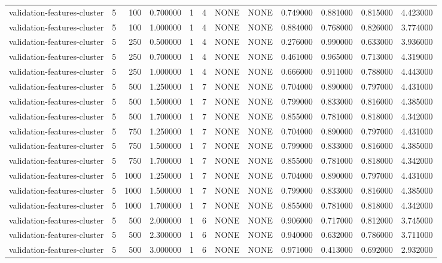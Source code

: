 \begin{tabular}{lrrrllllrrrr}
validation-features-cluster & 5 & 100 & 0.700000 & 1 & 4 & NONE & NONE & 0.749000 & 0.881000 & 0.815000 & 4.423000 \\
validation-features-cluster & 5 & 100 & 1.000000 & 1 & 4 & NONE & NONE & 0.884000 & 0.768000 & 0.826000 & 3.774000 \\
validation-features-cluster & 5 & 250 & 0.500000 & 1 & 4 & NONE & NONE & 0.276000 & 0.990000 & 0.633000 & 3.936000 \\
validation-features-cluster & 5 & 250 & 0.700000 & 1 & 4 & NONE & NONE & 0.461000 & 0.965000 & 0.713000 & 4.319000 \\
validation-features-cluster & 5 & 250 & 1.000000 & 1 & 4 & NONE & NONE & 0.666000 & 0.911000 & 0.788000 & 4.443000 \\
validation-features-cluster & 5 & 500 & 1.250000 & 1 & 7 & NONE & NONE & 0.704000 & 0.890000 & 0.797000 & 4.431000 \\
validation-features-cluster & 5 & 500 & 1.500000 & 1 & 7 & NONE & NONE & 0.799000 & 0.833000 & 0.816000 & 4.385000 \\
validation-features-cluster & 5 & 500 & 1.700000 & 1 & 7 & NONE & NONE & 0.855000 & 0.781000 & 0.818000 & 4.342000 \\
validation-features-cluster & 5 & 750 & 1.250000 & 1 & 7 & NONE & NONE & 0.704000 & 0.890000 & 0.797000 & 4.431000 \\
validation-features-cluster & 5 & 750 & 1.500000 & 1 & 7 & NONE & NONE & 0.799000 & 0.833000 & 0.816000 & 4.385000 \\
validation-features-cluster & 5 & 750 & 1.700000 & 1 & 7 & NONE & NONE & 0.855000 & 0.781000 & 0.818000 & 4.342000 \\
validation-features-cluster & 5 & 1000 & 1.250000 & 1 & 7 & NONE & NONE & 0.704000 & 0.890000 & 0.797000 & 4.431000 \\
validation-features-cluster & 5 & 1000 & 1.500000 & 1 & 7 & NONE & NONE & 0.799000 & 0.833000 & 0.816000 & 4.385000 \\
validation-features-cluster & 5 & 1000 & 1.700000 & 1 & 7 & NONE & NONE & 0.855000 & 0.781000 & 0.818000 & 4.342000 \\
validation-features-cluster & 5 & 500 & 2.000000 & 1 & 6 & NONE & NONE & 0.906000 & 0.717000 & 0.812000 & 3.745000 \\
validation-features-cluster & 5 & 500 & 2.300000 & 1 & 6 & NONE & NONE & 0.940000 & 0.632000 & 0.786000 & 3.711000 \\
validation-features-cluster & 5 & 500 & 3.000000 & 1 & 6 & NONE & NONE & 0.971000 & 0.413000 & 0.692000 & 2.932000 \\

\end{tabular}
